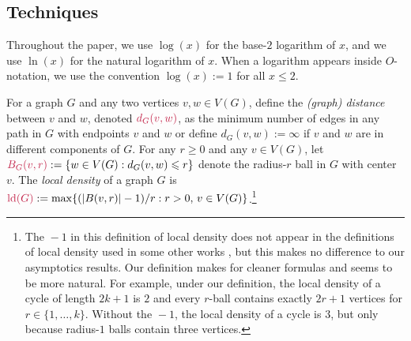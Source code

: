 \documentclass{patmorin}
\makeatletter
\renewcommand{\ge}{\geqslant}
\renewcommand{\le}{\leqslant}
\newcommand{\defin}[1]{\emph{\textcolor{brightmaroon}{#1}}}
\def\mathcolor#1#{\@mathcolor{#1}}
\def\@mathcolor#1#2#3{%
  \protect\leavevmode
  \begingroup
    \color#1{#2}#3%
  \endgroup
}
\newcommand{\mathdefin}[1]{\mathcolor{brightmaroon}{#1}}
\DeclareMathOperator{\bw}{bw}
\DeclareMathOperator{\ld}{ld}
\makeatother
\begin{document}
\subsection{Techniques}


Throughout the paper, we use $\log(x)$ for the base-$2$ logarithm of $x$, and we use $\ln(x)$ for the natural logarithm of $x$. When a logarithm appears inside $O$-notation, we use the convention $\log(x):=1$ for all $x\le 2$.

For a graph $G$ and any two vertices $v,w\in V(G)$, define the \defin{(graph) distance} between $v$ and $w$, denoted $\mathdefin{d_G(v,w)}$, as the minimum number of edges in any path in $G$ with endpoints $v$ and $w$ or define $d_G(v,w):=\infty$ if $v$ and $w$ are in different components of $G$.  For any $r\ge 0$ and any $v\in V(G)$, let $\mathdefin{B_G(v,r)}:=\{w\in V(G):d_G(v,w)\le r\}$ denote the radius-$r$ ball in $G$ with center $v$.
The \defin{local density} of a graph $G$ is $\mathdefin{\ld(G)}:=\max\{(|B(v,r)|-1)/r:r> 0,\, v\in V(G)\}$.\footnote{The ${}-1$ in this definition of local density does not appear in the definitions of local density used in some other works \cite{feige:approximating,rao:small}, but this makes no difference to our asymptotics results.  Our definition makes for cleaner formulas and seems to be more natural. For example, under our definition, the local density of a cycle of length $2k+1$ is $2$ and every $r$-ball contains exactly $2r+1$ vertices for $r\in\{1,\ldots,k\}$. Without the ${}-1$, the local density of a cycle is $3$, but only because radius-$1$ balls contain three vertices.}


\end{document}
